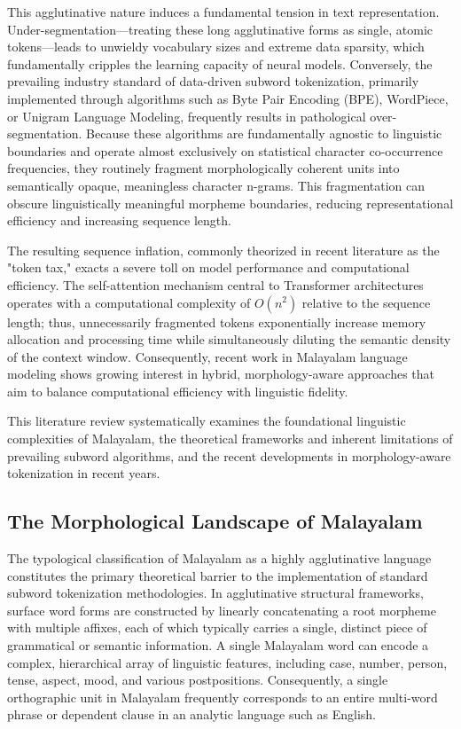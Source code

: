 \documentclass[12pt]{article}
\begin{document}
	This agglutinative nature induces a fundamental tension in text representation. Under-segmentation—treating these long agglutinative forms as single, atomic tokens—leads to unwieldy vocabulary sizes and extreme data sparsity, which fundamentally cripples the learning capacity of neural models. Conversely, the prevailing industry standard of data-driven subword tokenization, primarily implemented through algorithms such as Byte Pair Encoding (BPE), WordPiece, or Unigram Language Modeling, frequently results in pathological over-segmentation. Because these algorithms are fundamentally agnostic to linguistic boundaries and operate almost exclusively on statistical character co-occurrence frequencies, they routinely fragment morphologically coherent units into semantically opaque, meaningless character n-grams. This fragmentation can obscure linguistically meaningful morpheme boundaries, reducing representational efficiency and increasing sequence length.\cite{sennrich-etal-2016-neural,brahma2025morphtok}
	
	The resulting sequence inflation, commonly theorized in recent literature as the "token tax," exacts a severe toll on model performance and computational efficiency. The self-attention mechanism central to Transformer architectures operates with a computational complexity of $O(n^2)$ relative to the sequence length; thus, unnecessarily fragmented tokens exponentially increase memory allocation and processing time while simultaneously diluting the semantic density of the context window.\cite{token_tax_2025, self_attention_constant_2026} Consequently, recent work in Malayalam language modeling shows growing interest in hybrid, morphology-aware approaches that aim to balance computational efficiency with linguistic fidelity.\cite{brahma2025morphtok}
	
	This literature review systematically examines the foundational linguistic complexities of Malayalam, the theoretical frameworks and inherent limitations of prevailing subword algorithms, and the recent developments in morphology-aware tokenization in recent years. 
	
	\subsection{The Morphological Landscape of Malayalam}
	
	The typological classification of Malayalam as a highly agglutinative language constitutes the primary theoretical barrier to the implementation of standard subword tokenization methodologies. In agglutinative structural frameworks, surface word forms are constructed by linearly concatenating a root morpheme with multiple affixes, each of which typically carries a single, distinct piece of grammatical or semantic information. A single Malayalam word can encode a complex, hierarchical array of linguistic features, including case, number, person, tense, aspect, mood, and various postpositions. Consequently, a single orthographic unit in Malayalam frequently corresponds to an entire multi-word phrase or dependent clause in an analytic language such as English.\cite{}
	
\end{document}
